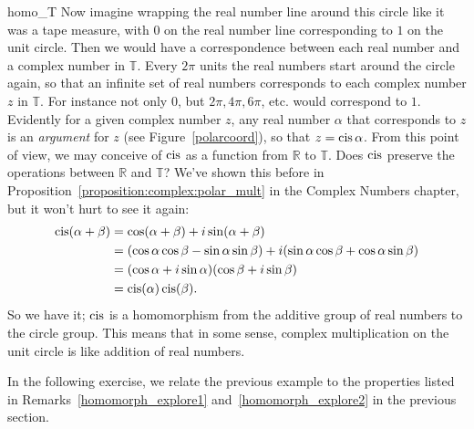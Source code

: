 \begin{example}{homo_T}
\noindent
Now imagine wrapping the real number line around this circle like it was a tape measure, with $0$ on the real number line corresponding to $1$ on the unit circle.  Then we would have a correspondence between each real number and a complex number in ${ \mathbb T}$. Every $2\pi$ units the real numbers start around the circle again, so that an infinite set of real numbers corresponds to each complex number $z$ in ${ \mathbb T}$.  For instance not only 0, but $2\pi, 4\pi, 6\pi$, etc. would correspond to $1$.  
Evidently for a given complex number $z$, any real number $\alpha$ that corresponds to $z$ is an \emph{argument} for $z$ (see Figure~\ref{polarcoord}), so that $z = \operatorname{cis} \alpha$.
From this point of view, we may conceive of $\operatorname{cis}$ as  a function from ${ \mathbb R}$ to  ${ \mathbb T}$.   Does $\operatorname{cis}$ preserve the operations between ${ \mathbb R}$ and ${ \mathbb T}$? We've shown this before in Proposition~\ref{proposition:complex:polar_mult} in the Complex Numbers chapter, but it won't hurt to see it again:
\begin{align*}
\operatorname{cis}( \alpha + \beta )
& =
\cos( \alpha + \beta ) + i \sin( \alpha + \beta ) \\
& =
(\cos \alpha \cos \beta - \sin \alpha \sin \beta)  + i( \sin \alpha 
\cos \beta + \cos \alpha \sin \beta ) \\
& =
(\cos \alpha + i \sin \alpha )(\cos \beta + i \sin \beta
) \\
& = \operatorname{cis}( \alpha ) \operatorname{cis}( \beta ).
\end{align*}
So we have it; $\operatorname{cis}$ is a homomorphism from the additive group of real numbers to the circle group.
This means that in some sense, complex multiplication on the unit circle is like addition of real numbers.
\end{example}

In the following exercise, we relate the previous example to the properties listed in  Remarks~\ref{homomorph_explore1} and~\ref{homomorph_explore2} in the previous section.

